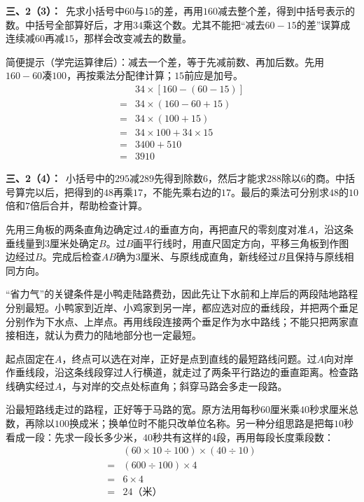 \documentclass[multi=snippet,border=0pt]{standalone}
\newenvironment{snippet}[3]{\begin{minipage}{#1bp}\color{answerred}\fontsize{#2}{#3}\selectfont\raggedright}{\end{minipage}}
\begin{document}
\begin{snippet}{505}{11.5}{14}\textbf{三、2（3）：}\ 先求小括号中\(60\)与\(15\)的差，再用\(160\)减去整个差，得到中括号表示的数。中括号全部算好后，才用\(34\)乘这个数。尤其不能把“减去\(60-15\)的差”误算成连续减\(60\)再减\(15\)，那样会改变减去的数量。\par 简便提示（学完运算律后）：减去一个差，等于先减前数、再加后数。先用\(160-60\)凑\(100\)，再按乘法分配律计算；\(15\)前应是加号。\[\begin{aligned}&34\times[160-(60-15)]\\={}&34\times(160-60+15)\\={}&34\times(100+15)\\={}&34\times100+34\times15\\={}&3400+510\\={}&3910\end{aligned}\]\end{snippet}
\begin{snippet}{505}{11.5}{14}\textbf{三、2（4）：}\ 小括号中的\(295\)减\(289\)先得到除数\(6\)，然后才能求\(288\)除以\(6\)的商。中括号算完以后，把得到的\(48\)再乘\(17\)，不能先乘右边的\(17\)。最后的乘法可分别求\(48\)的\(10\)倍和\(7\)倍后合并，帮助检查计算。\end{snippet}
\begin{snippet}{505}{11.5}{14}先用三角板的两条直角边确定过\(A\)的垂直方向，再把直尺的零刻度对准\(A\)，沿这条垂线量到\(3\)厘米处确定\(B\)。过\(B\)画平行线时，用直尺固定方向，平移三角板到作图边经过\(B\)。完成后检查\(AB\)确为\(3\)厘米、与原线成直角，新线经过\(B\)且保持与原线相同方向。\end{snippet}
\begin{snippet}{505}{11.5}{14}“省力气”的关键条件是小鸭走陆路费劲，因此先让下水前和上岸后的两段陆地路程分别最短。小鸭家到近岸、小鸡家到另一岸，都应选对应的垂线段，并把两个垂足分别作为下水点、上岸点。再用线段连接两个垂足作为水中路线；不能只把两家直接相连，就认为费力的陆地部分也一定最短。\end{snippet}
\begin{snippet}{505}{11.5}{14}起点固定在\(A\)，终点可以选在对岸，正好是点到直线的最短路线问题。过\(A\)向对岸作垂线段，沿这条线段穿过人行横道，就走过了两条平行路边的垂直距离。检查路线确实经过\(A\)，与对岸的交点处标直角；斜穿马路会多走一段路。\end{snippet}
\begin{snippet}{505}{11.5}{14}沿最短路线走过的路程，正好等于马路的宽。原方法用每秒\(60\)厘米乘\(40\)秒求厘米总数，再除以\(100\)换成米；换单位时不能只改单位名称。另一种分组思路是把每\(10\)秒看成一段：先求一段长多少米，\(40\)秒共有这样的\(4\)段，再用每段长度乘段数：\[\begin{aligned}&(60\times10\div100)\times(40\div10)\\={}&(600\div100)\times4\\={}&6\times4\\={}&24\text{（米）}\end{aligned}\]\end{snippet}
\end{document}

